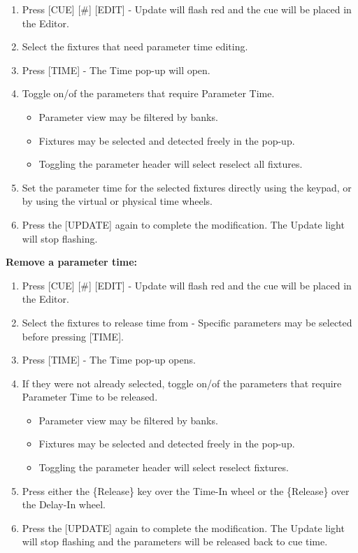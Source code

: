\documentclass[
]{article}
\begin{document}
\begin{enumerate}
\def\labelenumi{\arabic{enumi}.}
\item
  Press {[}CUE{]} {[}\#{]} {[}EDIT{]} - Update will flash red and the cue will be placed in the Editor.
\item
  Select the fixtures that need parameter time editing.
\item
  Press {[}TIME{]} - The Time pop-up will open.
\item
  Toggle on/of the parameters that require Parameter Time.

  \begin{itemize}
  \item
    Parameter view may be filtered by banks.
  \item
    Fixtures may be selected and detected freely in the pop-up.
  \item
    Toggling the parameter header will select reselect all fixtures.
  \end{itemize}
\item
  Set the parameter time for the selected fixtures directly using the keypad, or by using the virtual or physical time wheels.
\item
  Press the {[}UPDATE{]} again to complete the modification. The Update light will stop flashing.
\end{enumerate}

\textbf{Remove a parameter time:}

\begin{enumerate}
\def\labelenumi{\arabic{enumi}.}
\item
  Press {[}CUE{]} {[}\#{]} {[}EDIT{]} - Update will flash red and the cue will be placed in the Editor.
\item
  Select the fixtures to release time from - Specific parameters may be selected before pressing {[}TIME{]}.
\item
  Press {[}TIME{]} - The Time pop-up opens.
\item
  If they were not already selected, toggle on/of the parameters that require Parameter Time to be released.

  \begin{itemize}
  \item
    Parameter view may be filtered by banks.
  \item
    Fixtures may be selected and detected freely in the pop-up.
  \item
    Toggling the parameter header will select reselect fixtures.
  \end{itemize}
\item
  Press either the \{Release\} key over the Time-In wheel or the \{Release\} over the Delay-In wheel.
\item
  Press the {[}UPDATE{]} again to complete the modification. The Update light will stop flashing and the parameters will be released back to cue time.
\end{enumerate}
\end{document}
